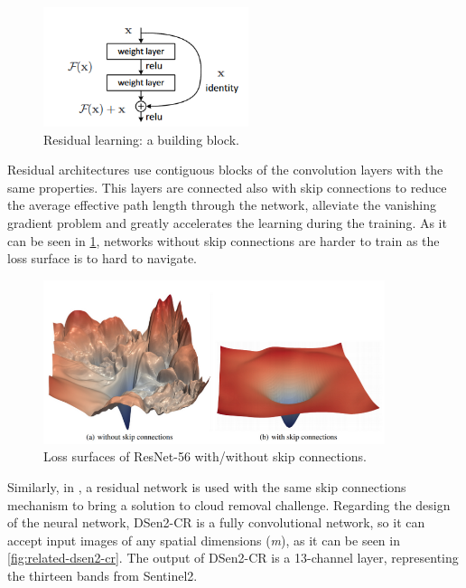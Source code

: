 \documentclass[../main.tex]{subfiles}
\begin{document}
\begin{figure}[H]
	\centering
	\includegraphics[width=6cm]{imgs/relatedwork/residualblock.png}
	\caption{Residual learning: a building block.}
\end{figure}
Residual architectures use contiguous blocks of the convolution layers with the same properties. This layers are connected also with skip connections to reduce the average effective path length through the network, alleviate the vanishing gradient problem and greatly accelerates the learning during the training.  As it can be seen in \ref{fig:related-residual-loss}, networks without skip connections are harder to train as the loss surface is to hard to navigate. \cite{NEURIPS2018_a41b3bb3}
\begin{figure}[H]
	\centering
	\includegraphics[width=10cm]{imgs/relatedwork/resloss.png}
	\caption{Loss surfaces of ResNet-56 with/without skip connections.}
	\label{fig:related-residual-loss}
\end{figure}
Similarly, in \cite{Meraner2020}, a residual network is used with the same skip connections mechanism to bring a solution to cloud removal challenge.
Regarding the design of the neural network, DSen2-CR is a fully convolutional network, so it can accept input images of any spatial dimensions (\textit{m}), as it can be seen in \ref{fig:related-dsen2-cr}.
The  output of DSen2-CR is a 13-channel layer, representing the thirteen bands from Sentinel2.  
\end{document}
